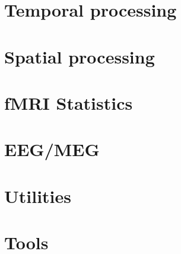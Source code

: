 \documentclass[a4paper,titlepage]{book}
\begin{document}

%


\part{Temporal processing}




\part{Spatial processing}









\part{fMRI Statistics}



%


\part{EEG/MEG}










\part{Utilities}




%






\part{Tools}
\end{document}

